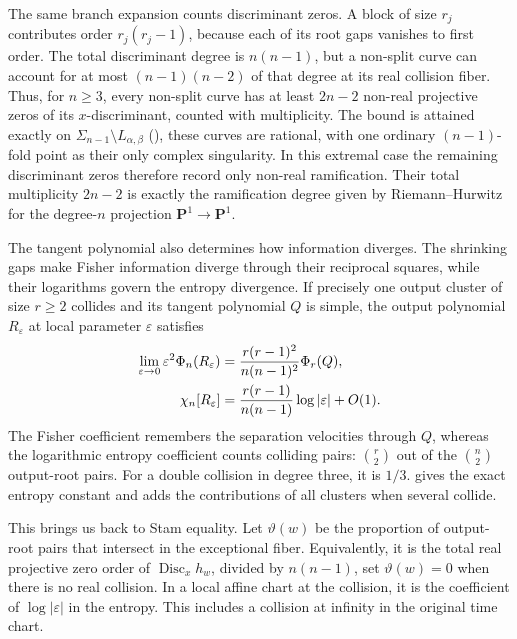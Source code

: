 \documentclass[12pt,reqno]{amsart}
\theoremstyle{definition}
\theoremstyle{remark}
\begin{document}
The same branch expansion counts discriminant zeros.  A block of size
\(r_j\) contributes order \(r_j(r_j-1)\), because each of its root
gaps vanishes to first order.  The total discriminant degree is
\(n(n-1)\), but a non-split curve can account for at most
\((n-1)(n-2)\) of that degree at its real collision fiber.
Thus, for \(n\geq3\), every non-split curve has at least \(2n-2\)
non-real projective zeros of its \(x\)-discriminant, counted with
multiplicity.  The bound is attained exactly on
\(\Sigma_{n-1}\setminus L_{\alpha,\beta}\)
(), these curves are rational, with
one ordinary \((n-1)\)-fold point as their only complex singularity.
In this extremal case the remaining discriminant zeros therefore record
only non-real ramification.  Their total multiplicity \(2n-2\) is
exactly the ramification degree given by Riemann--Hurwitz for the
degree-\(n\) projection \(\mathbf P^1\to\mathbf P^1\).

The tangent polynomial also determines how information diverges.
The shrinking gaps make Fisher information diverge through their
reciprocal squares, while their logarithms govern the entropy divergence.
If precisely one output cluster of size \(r\geq2\) collides and its tangent polynomial \(Q\) is simple, the output polynomial \(R_\varepsilon\) at local parameter
\(\varepsilon\) satisfies
\begin{align}\label{eq:intro-collision-information}
 \lim_{\varepsilon\to0}\varepsilon^2\Phi_n(R_\varepsilon)
 &=\frac{r(r-1)^2}{n(n-1)^2}\Phi_r(Q),\notag\\
 \chi_n[R_\varepsilon]
 &=\frac{r(r-1)}{n(n-1)}\log|\varepsilon|+O(1).
\end{align}
The Fisher coefficient remembers the separation velocities through
\(Q\), whereas the logarithmic entropy coefficient counts colliding
pairs: \(\binom r2\) out of the \(\binom n2\) output-root pairs.
For a double collision in degree three, it is \(1/3\).
 gives the exact entropy constant and
adds the contributions of all clusters when several collide.

This brings us back to Stam equality.  Let \(\vartheta(w)\) be the
proportion of output-root pairs that intersect in the exceptional fiber.
Equivalently, it is the total real projective zero order of
\(\operatorname{Disc}_x h_w\), divided by \(n(n-1)\), set
\(\vartheta(w)=0\) when there is no real collision.  In a local
affine chart at the collision, it is the coefficient of
\(\log|\varepsilon|\) in the entropy.  This includes a collision
at infinity in the original time chart.
\end{document}
